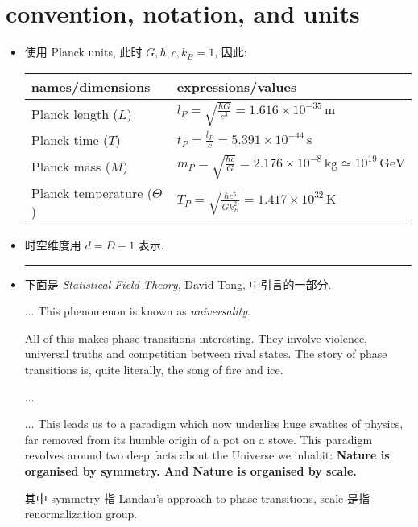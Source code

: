 \chapter*{convention, notation, and units}
\begin{itemize}
	\item 使用 Planck units, 此时 $G, \hbar, c, k_B = 1$, 因此:
	
	\begin{center}
		\begin{tabularx}{\linewidth}{XX}
			\toprule 
			names/dimensions & expressions/values \\
			\midrule 
			Planck length ($L$) & $l_P = \sqrt{\frac{\hbar G}{c^3}} = 1.616 \times 10^{- 35} \, \text{m}$ \\
			Planck time ($T$) & $t_P = \frac{l_P}{c} = 5.391 \times 10^{- 44} \, \text{s}$ \\
			Planck mass ($M$) & $m_P = \sqrt{\frac{\hbar c}{G}} = 2.176 \times 10^{- 8} \, \text{kg} \simeq 10^{19} \, \text{GeV}$ \\
			Planck temperature ($\Theta$) & $T_P = \sqrt{\frac{\hbar c^5}{G k_B^2}} = 1.417 \times 10^{32} \, \text{K}$ \\
			\bottomrule
		\end{tabularx}
	\end{center}
	
	\item 时空维度用 $d = D + 1$ 表示.
	
	\noindent\rule[0.5ex]{\linewidth}{0.5pt} %
	
	\item 下面是 \textit{Statistical Field Theory}, David Tong, 中引言的一部分.
	
	\begin{tcolorbox}
		... This phenomenon is known as \textit{universality}.
		
		All of this makes phase transitions interesting. They involve violence, universal truths
		and competition between rival states. The story of phase transitions is, quite literally,
		the song of fire and ice.
		
		...
		
		... This leads us to a paradigm which now underlies huge swathes of physics, far removed from its humble origin of a pot on a stove. This paradigm revolves around two deep facts about the Universe we inhabit: \textbf{Nature is organised by symmetry. And Nature is organised by scale.}
	\end{tcolorbox}
	
	其中 symmetry 指 Landau's approach to phase transitions, scale 是指 renormalization group.
\end{itemize}
